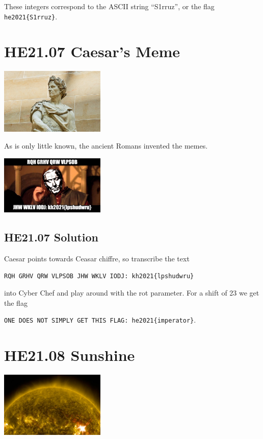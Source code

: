 \documentclass[english,a4paper,nols,noindent]{tufte-handout}
\begin{document}
These integers correspond to the ASCII string ``S1rruz'', or the flag \verb+he2021{S1rruz}+.

\hypertarget{he21.07}{%
\section{HE21.07 Caesar's Meme}\label{he21.07}}
\begin{marginfigure}
    \includegraphics[width=50mm]{images/challenge7.jpg}
\end{marginfigure}

\noindent As is only little known, the ancient Romans invented the memes.

\begin{marginfigure}
    \includegraphics[width=50mm]{ch07/caesarsmeme.jpg}
\end{marginfigure}

\hypertarget{he21.07-solution}{%
\subsection{HE21.07 Solution}\label{he21.07-solution}}

Caesar points towards Ceasar chiffre, so transcribe the text

\verb+RQH GRHV QRW VLPSOB JHW WKLV IODJ: kh2021{lpshudwru}+

\noindent into Cyber Chef and play around with the rot parameter.  For a shift
of 23 we get the flag

\verb+ONE DOES NOT SIMPLY GET THIS FLAG: he2021{imperator}+.

\hypertarget{he21.08}{%
\section{HE21.08 Sunshine}\label{he21.08}}
\begin{marginfigure}
    \includegraphics[width=50mm]{images/challenge8.jpg}
\end{marginfigure}
\end{document}
